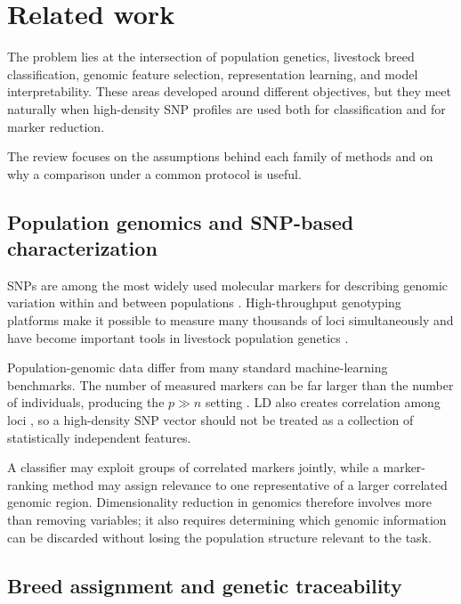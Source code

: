\chapter{Related work}
\label{chap:related_work}

The problem lies at the intersection of population genetics, livestock
breed classification, genomic feature selection, representation
learning, and model interpretability. These areas developed around
different objectives, but they meet naturally when high-density SNP
profiles are used both for classification and for marker reduction.

The review focuses on the assumptions behind each family of methods
and on why a comparison under a common protocol is useful.

\section{Population genomics and SNP-based characterization}
\label{sec:pop_genetics_snps}

SNPs are among the most widely used molecular markers for describing
genomic variation within and between populations
\cite{morin2004snps}. High-throughput genotyping platforms make it
possible to measure many thousands of loci simultaneously and have
become important tools in livestock population genetics
\cite{georges2019livestock, sorbolini2016signatures}.

Population-genomic data differ from many standard machine-learning
benchmarks. The number of measured markers
can be far larger than the number of individuals, producing the
$p\gg n$ setting \cite{saeys2007feature, chafai2023mlanimal}. LD also
creates correlation among loci
\cite{slatkin2008linkage, pritchard2001linkage}, so a high-density SNP
vector should not be treated as a collection of statistically
independent features.

A classifier may exploit groups of correlated markers jointly, while a
marker-ranking method may assign relevance to one representative of a
larger correlated genomic region. Dimensionality reduction in genomics
therefore involves more than removing variables; it also requires
determining which genomic information can be discarded without losing
the population structure relevant to the task.

\section{Breed assignment and genetic traceability}
\label{sec:breed_classification_selection}

